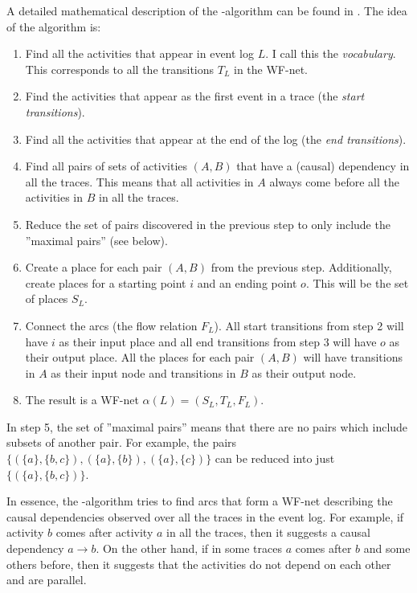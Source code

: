 A detailed mathematical description of the \textalpha-algorithm can be found in \cite{van2004workflow}.
The idea of the algorithm is:

\begin{enumerate}
    \item Find all the activities that appear in event log $L$. I call this the \emph{vocabulary}. This corresponds to all the transitions $T_L$ in the WF-net.
    \item Find the activities that appear as the first event in a trace (the \emph{start transitions}).
    \item Find all the activities that appear at the end of the log (the \emph{end transitions}).
    \item Find all pairs of sets of activities $(A,B)$ that have a (causal) dependency in all the traces. This means that all activities in $A$ always come before all the activities in $B$ in all the traces.
    \item Reduce the set of pairs discovered in the previous step to only include the ''maximal pairs'' (see below). 
    \item Create a place for each pair $(A,B)$ from the previous step. Additionally, create places for a starting point $i$ and an ending point $o$. This will be the set of places $S_L$.
    \item Connect the arcs (the flow relation $F_L$). All start transitions from step 2 will have $i$ as their input place and all end transitions from step 3 will have $o$ as their output place. All the places for each pair $(A,B)$ will have transitions in $A$ as their input node and transitions in $B$ as their output node.
    \item The result is a WF-net $\alpha(L) = ( S_L, T_L, F_L )$.
\end{enumerate}

In step 5, the set of ''maximal pairs'' means that there are no pairs which include subsets of another pair. For example, the pairs $\{(\{a\},\{b,c\}),(\{a\},\{b\}),(\{a\},\{c\})\}$ can be reduced into just $\{(\{a\},\{b,c\})\}$.

In essence, the \textalpha-algorithm tries to find arcs that form a WF-net describing the causal dependencies observed over all the traces in the event log. 
For example, if activity $b$ comes after activity $a$ in all the traces, then it suggests a causal dependency $a \rightarrow b$.
On the other hand, if in some traces $a$ comes after $b$ and some others before, then it suggests that the activities do not depend on each other and are parallel.

